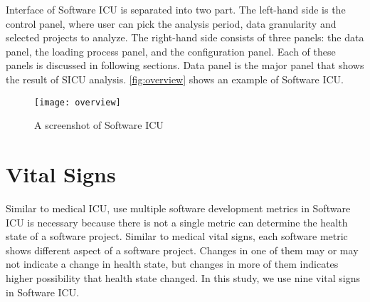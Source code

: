 Interface of Software ICU is separated into two part. The left-hand side is the control panel, where user can pick the analysis period, data granularity and selected projects to analyze. The right-hand side consists of three panels: the data panel, the loading process panel, and the configuration panel. Each of these panels is discussed in following sections. Data panel is the major panel that shows the result of SICU analysis. \autoref{fig:overview} shows an example of Software ICU.

\begin{figure}[htbp]
   \centering
   \texttt{[image: overview]}
   \caption{A screenshot of Software ICU}
   \label{fig:overview}
\end{figure}

\section{Vital Signs}
\label{vitalSign}

Similar to medical ICU, use multiple software development metrics in Software ICU is necessary because there is not a single metric can determine the health state of a software project. Similar to medical vital signs, each software metric shows different aspect of a software project. Changes in one of them may or may not indicate a change in health state, but changes in more of them indicates higher possibility that health state changed. In this study, we use nine vital signs in Software ICU.


